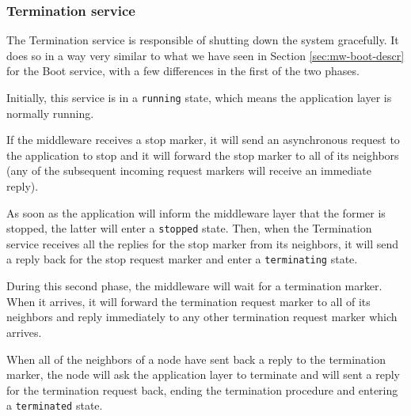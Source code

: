 \subsubsection{Termination service}

The Termination service is responsible of shutting down the system gracefully.
It does so in a way very similar to what we have seen in Section
\ref{sec:mw-boot-descr} for the Boot service, with a few differences in the
first of the two phases.

Initially, this service is in a \texttt{running} state, which means the
application layer is normally running.

If the middleware receives a stop marker, it will send an asynchronous request
to the application to stop and it will forward the stop marker to all of its
neighbors (any of the subsequent incoming request markers will receive an
immediate reply).

As soon as the application will inform the middleware layer that the former is
stopped, the latter will enter a \texttt{stopped} state. Then, when the
Termination service receives all the replies for the stop marker from its
neighbors, it will send a reply back for the stop request marker and enter a
\texttt{terminating} state.

During this second phase, the middleware will wait for a termination marker.
When it arrives, it will forward the termination request marker to all of its
neighbors and reply immediately to any other termination request marker which
arrives.

When all of the neighbors of a node have sent back a reply to the termination
marker, the node will ask the application layer to terminate and will sent a
reply for the termination request back, ending the termination procedure and
entering a \texttt{terminated} state.

